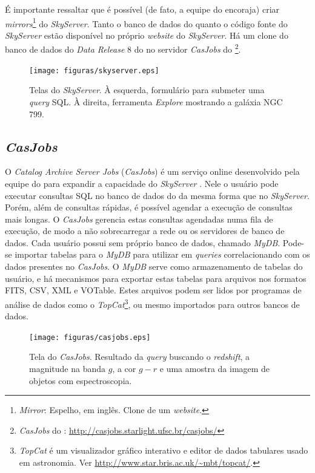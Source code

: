 É importante ressaltar que é possível (de fato, a equipe do \SDSS encoraja)
criar {\em mirrors}\footnote{{\em Mirror}: Espelho, em inglês. Clone de um {\em
website}.} do {\em SkyServer}. Tanto o banco de dados do \SDSS quanto o código
fonte do {\em SkyServer} estão disponível no próprio {\em website} do {\em
SkyServer}. Há um clone do banco de dados do {\em Data Release} 8 do \SDSS no
servidor {\em CasJobs} do \starlight \footnote{{\em CasJobs} do \starlight:
\url{http://casjobs.starlight.ufsc.br/casjobs/}}.

\begin{figure}
	\texttt{[image: figuras/skyserver.eps]}
	\caption[Telas do {\em SkyServer}.]
	{Telas do {\em SkyServer}. À esquerda, formulário para submeter uma {\em
	query} SQL. À direita, ferramenta {\em Explore} mostrando a galáxia NGC 799.}
	\label{fig:TelaDoSkyServer}
\end{figure}

\subsection{{\em CasJobs}}
\label{sec:CrossMatch:SDSS:CasJobs}

O {\em Catalog Archive Server Jobs} ({\em CasJobs}) é um serviço online
desenvolvido pela equipe do \SDSS para expandir a capacidade do {\em SkyServer}
\citep{Li2008}. Nele o usuário pode executar consultas SQL no banco de dados do
\SDSS da mesma forma que no {\em SkyServer}. Porém, além de consultas rápidas, é
possível agendar a execução de consultas mais longas. O {\em CasJobs} gerencia
estas consultas agendadas numa fila de execução, de modo a não sobrecarregar a
rede ou os servidores de banco de dados. Cada usuário possui sem próprio banco
de dados, chamado {\em MyDB}. Pode-se importar tabelas para o {\em MyDB} para
utilizar em {\em queries} correlacionando com os dados presentes no {\em
CasJobs}. O {\em MyDB} serve como armazenamento de tabelas do usuário, e há
mecanismos para exportar estas tabelas para arquivos nos formatos FITS, CSV, XML
e VOTable. Estes arquivos podem ser lidos por programas de análise de dados como
o {\em TopCat}\footnote{{\em TopCat} é um visualizador gráfico interativo e
editor de dados tabulares usado em astronomia. Ver
\url{http://www.star.bris.ac.uk/~mbt/topcat/}.}, ou mesmo importados para outros
bancos de dados.

\begin{figure}
	\texttt{[image: figuras/casjobs.eps]}
	\caption[Tela do {\em CasJobs}.]
	{Tela do {\em CasJobs}. Resultado da {\em query} buscando o {\em redshift}, a
	magnitude na banda $g$, a cor $g-r$ e uma amostra da imagem de objetos com
	espectroscopia.}
	\label{fig:CasJobs}
\end{figure}

